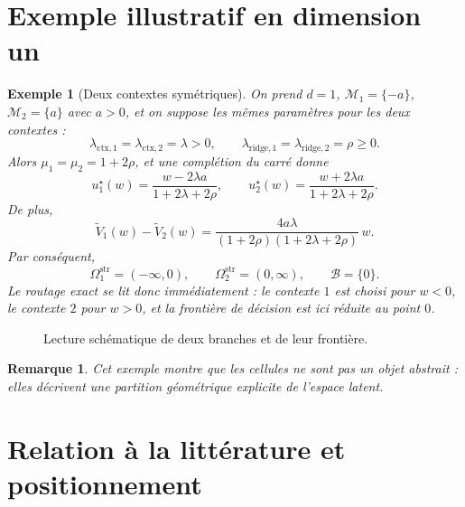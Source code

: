 \documentclass[11pt,a4paper]{article}
\newtheorem{remark}{Remarque}[section]
\newtheorem{example}{Exemple}[section]
\newcommand{\Mcal}{\mathcal M}
\newcommand{\Bcal}{\mathcal B}
\begin{document}
\section{Exemple illustratif en dimension un}

\begin{example}[Deux contextes symétriques]
On prend \(d=1\), \(\Mcal_1=\{-a\}\), \(\Mcal_2=\{a\}\) avec \(a>0\), et on suppose les mêmes paramètres pour les deux contextes :
\[
\lambda_{\mathrm{ctx},1}=\lambda_{\mathrm{ctx},2}=\lambda>0,
\qquad
\lambda_{\mathrm{ridge},1}=\lambda_{\mathrm{ridge},2}=\rho\ge 0.
\]
Alors \(\mu_1=\mu_2=1+2\rho\), et une complétion du carré donne
\[
u_1^\star(w)=\frac{w-2\lambda a}{1+2\lambda+2\rho},
\qquad
u_2^\star(w)=\frac{w+2\lambda a}{1+2\lambda+2\rho}.
\]
De plus,
\[
\widetilde V_1(w)-\widetilde V_2(w)
=
\frac{4a\lambda}{(1+2\rho)(1+2\lambda+2\rho)}\,w.
\]
Par conséquent,
\[
\Omega_1^{\mathrm{str}}=(-\infty,0),
\qquad
\Omega_2^{\mathrm{str}}=(0,\infty),
\qquad
\Bcal=\{0\}.
\]
Le routage exact se lit donc immédiatement : le contexte \(1\) est choisi pour \(w<0\), le contexte \(2\) pour \(w>0\), et la frontière de décision est ici réduite au point \(0\).
\end{example}

\begin{figure}[ht]
\centering
{}
\caption{Lecture schématique de deux branches et de leur frontière.}
\end{figure}

\begin{remark}
Cet exemple montre que les cellules ne sont pas un objet abstrait : elles décrivent une partition géométrique explicite de l'espace latent.
\end{remark}

\section{Relation à la littérature et positionnement}
\end{document}

